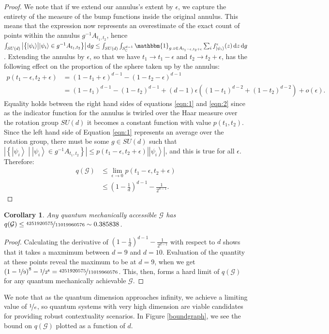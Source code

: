 \documentclass{amsart}
\newtheorem{cor}{Corollary}
\theoremstyle{definition}
\newcommand{\ket}[1]{{\left\vert{#1}\right\rangle}}
\newcommand*\dif{\mathop{}\!\mathrm{d}}
\begin{document}
\begin{proof}
We note that if we extend our annulus's extent by $\epsilon$, we capture the entirety of the measure of the bump functions inside the original annulus. This means that the expression now represents an overestimate of the exact count of points within the annulus $g^{-1}A_{t_1,t_2}$, hence $\int_{SU(d)} \left|\left\{\ket{\psi_i} \middle| \ket{\psi_i} \in g^{-1}A_{t_1,t_2}\right\}\right| \dif g\leq \int_{SU(d)} \int_{S_\mathbb{C}^{d-1}} \mathbbm{1}_{g.z\in A_{t_1-\epsilon,t_2+\epsilon}} \sum_i f^\epsilon_\ket{\psi_i}(z) \dif z \dif g$. Extending the annulus by $\epsilon$, so that we have $t_1\rightarrow t_1-\epsilon$ and $t_2\rightarrow t_2+\epsilon$,  has the following effect on the proportion of the sphere taken up by the annulus:
\begin{align}
p(t_1-\epsilon,t_2+\epsilon)&=\left(1-t_1+\epsilon\right)^{d-1}-\left(1-t_2-\epsilon\right)^{d-1}\\
&=(1-t_1)^{d-1}-(1-t_2)^{d-1}+(d-1)\epsilon\left((1-t_1)^{d-2}+(1-t_2)^{d-2}\right)+o(\epsilon).
\end{align}
Equality holds between the right hand sides of equations \ref{eqn:1} and \ref{eqn:2} since as the indicator function for the annulus is twirled over the Haar measure over the rotation group $SU(d)$ it becomes a constant function with value $p(t_1,t_2)$. Since the left hand side of Equation \ref{eqn:1} represents an average over the rotation group, there must be some $g\in SU(d)$ such that $\left|\left\{\ket{\psi_i} \middle| \ket{\psi_i} \in g^{-1}A_{t_1,t_2}\right\}\right|\leq p(t_1-\epsilon,t_2+\epsilon)\left|\ket{\psi_i}\right|$, and this is true for all $\epsilon$. Therefore:
\begin{align}
q(\mathcal{G})&\leq \lim_{\epsilon\rightarrow0}p(t_1-\epsilon,t_2+\epsilon) \\
&\leq \left(1-\frac1d\right)^{d-1}-\frac{1}{2^{d-1}}.
\end{align}

\end{proof} 
\begin{cor}
Any quantum mechanically accessible $\mathcal{G}$ has  $q(\mathcal{G})\leq\nicefrac{4251920575}{11019960576}\sim0.385838$.
\end{cor}
\begin{proof}
Calculating the derivative of $ \left(1-\frac1d\right)^{d-1}-\frac{1}{2^{d-1}}$ with respect to $d$ shows that it takes a maxmimum between $d=9$ and $d=10$. Evaluation of the quantity at these points reveal the maximum to be at $d=9$, when we get $\left(1-\nicefrac19\right)^{8}-\nicefrac{1}{2^{8}}=\nicefrac{4251920575}{11019960576}$. This, then, forms a hard limit of $q(\mathcal{G})$ for any quantum mechanically achievable $\mathcal{G}$.
\end{proof}
We note that as the quantum dimension approaches infinity, we achieve a limiting value of $\nicefrac1e$, so quantum systems with very high dimension are viable candidates for providing robust contextuality scenarios. In Figure \ref{boundgraph}, we see the bound on $q(\mathcal{G})$ plotted as a function of $d$.
\end{document}
